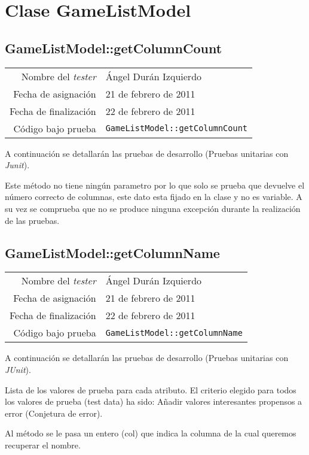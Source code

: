 \section{Clase GameListModel}

\subsection{GameListModel::getColumnCount}

{\small
\begin{tabular}{r|l}
Nombre del \textit{tester} & \'Angel Dur\'an Izquierdo\\
Fecha de asignación & 21 de febrero de 2011 \\
Fecha de finalización & 22 de febrero de 2011 \\
Código bajo prueba & \texttt{GameListModel::getColumnCount}
\end{tabular}
}

A continuación se detallarán las pruebas de desarrollo (Pruebas unitarias con \textit{Junit}).

Este m\'etodo no tiene ning\'un parametro por lo que solo se prueba que devuelve el n\'umero correcto de columnas, este dato esta fijado en la clase y no es variable. A su vez se comprueba que no se produce ninguna excepci\'on durante la realizaci\'on de las pruebas.

\subsection{GameListModel::getColumnName}

{\small
\begin{tabular}{r|l}
Nombre del \textit{tester} & \'Angel Dur\'an Izquierdo\\
Fecha de asignación & 21 de febrero de 2011 \\
Fecha de finalización & 22 de febrero de 2011 \\
Código bajo prueba & \texttt{GameListModel::getColumnName}
\end{tabular}
}

A continuación se detallarán las pruebas de desarrollo (Pruebas unitarias con \textit{JUnit}).

Lista de los valores de prueba para cada atributo.
El criterio elegido para todos los valores de prueba (test data) ha sido: Añadir valores interesantes propensos a error (Conjetura de error).

Al m\'etodo se le pasa un entero (col) que indica la columna de la cual queremos recuperar el nombre. 

